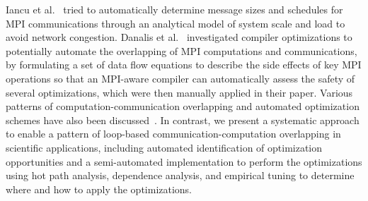 Iancu  et al.~\cite{iancu:ppopp07}
tried to automatically determine message sizes and schedules for MPI communications through an analytical model of system scale and load  to avoid network congestion.
Danalis et al.~\cite{danalis:ics09} investigated compiler optimizations to potentially automate the overlapping of MPI computations and communications, by
formulating a set of data flow equations to describe the side effects of key MPI operations so that an MPI-aware compiler can automatically assess the safety of several optimizations, which were then manually applied in their paper.
Various patterns of computation-communication overlapping and automated optimization schemes have also been discussed~\cite{danalis:sc05,fishgold:ipdps06}.
In contrast, 
we present a systematic approach to enable a pattern of loop-based communication-computation overlapping in scientific applications,
including automated identification of optimization opportunities and a semi-automated implementation to perform the optimizations
using hot path analysis, dependence analysis, and empirical tuning to determine where and how to apply the optimizations.


